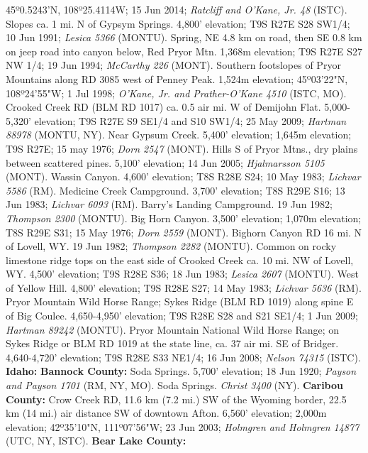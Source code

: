 45º0.5243'N, 108º25.4114W; 15 Jun 2014;
\textit{Ratcliff and O'Kane, Jr. 48} (ISTC).
Slopes ca. 1 mi. N of Gypsym Springs. 4,800' elevation; T9S R27E S28 SW1/4;
10 Jun 1991; \textit{Lesica 5366} (MONTU).
Spring, NE 4.8 km on road, then SE 0.8 km on jeep road into canyon
below, Red Pryor Mtn. 1,368m elevation; T9S R27E S27 NW 1/4; 19 Jun 1994;
\textit{McCarthy 226} (MONT).
Southern footslopes of Pryor Mountains along RD 3085 west of Penney Peak.
1,524m elevation; 45º03'22"N, 108º24'55"W; 1 Jul 1998;
\textit{O'Kane, Jr. and Prather-O'Kane 4510} (ISTC, MO).
Crooked Creek RD (BLM RD 1017) ca. 0.5 air mi. W of Demijohn Flat.
5,000-5,320' elevation; T9S R27E S9 SE1/4 and S10 SW1/4; 25 May 2009;
\textit{Hartman 88978} (MONTU, NY).
Near Gypsum Creek. 5,400' elevation; 1,645m elevation; T9S R27E; 15 may 1976;
\textit{Dorn 2547} (MONT).
Hills S of Pryor Mtns., dry plains between scattered pines. 5,100' elevation;
14 Jun 2005; \textit{Hjalmarsson 5105} (MONT).
Wassin Canyon. 4,600' elevation; T8S R28E S24; 10 May 1983;
\textit{Lichvar 5586} (RM).
Medicine Creek Campground. 3,700' elevation; T8S R29E S16; 13 Jun 1983;
\textit{Lichvar 6093} (RM).
Barry's Landing Campground. 19 Jun 1982; \textit{Thompson 2300} (MONTU).
Big Horn Canyon. 3,500' elevation; 1,070m elevation; T8S R29E S31; 15 May 1976;
\textit{Dorn 2559} (MONT).
Bighorn Canyon RD 16 mi. N of Lovell, WY. 19 Jun 1982;
\textit{Thompson 2282} (MONTU).
Common on rocky limestone ridge tops on the east side of Crooked Creek
ca. 10 mi. NW of Lovell, WY. 4,500' elevation; T9S R28E S36; 18 Jun 1983;
\textit{Lesica 2607} (MONTU).
West of Yellow Hill. 4,800' elevation; T9S R28E S27; 14 May 1983;
\textit{Lichvar 5636} (RM).
Pryor Mountain Wild Horse Range; Sykes Ridge (BLM RD 1019) along spine E of
Big Coulee. 4,650-4,950' elevation; T9S R28E S28 and S21 SE1/4; 1 Jun 2009;
\textit{Hartman 89242} (MONTU).
Pryor Mountain National Wild Horse Range; on Sykes Ridge or BLM RD 1019 at
the state line, ca. 37 air mi. SE of Bridger. 4,640-4,720' elevation;
T9S R28E S33 NE1/4; 16 Jun 2008; \textit{Nelson 74315} (ISTC).
  \textbf{Idaho:}
  \textbf{Bannock County:}
Soda Springs. 5,700' elevation; 18 Jun 1920;
\textit{Payson and Payson 1701} (RM, NY, MO).
Soda Springs. \textit{Christ 3400} (NY).
  \textbf{Caribou County:}
Crow Creek RD, 11.6 km (7.2 mi.) SW of the Wyoming border, 22.5 km (14 mi.)
air distance SW of downtown Afton. 6,560' elevation; 2,000m elevation;
42º35'10"N, 111º07'56"W; 23 Jun 2003;
\textit{Holmgren and Holmgren 14877} (UTC, NY, ISTC).
  \textbf{Bear Lake County:}
